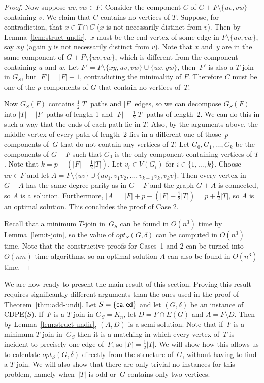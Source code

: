 \documentclass[11pt]{llncs}
\newcommand{\opts}{opt_S}
\newcommand{\ed}{{\sf ed}}
\newcommand{\ea}{{\sf ea}}
\newcommand{\cdpe}{{\sc CDPE}}
\begin{document}
\begin{proof}
Now suppose $uv,vw \in F$. Consider the component $C$ of
$G+F\setminus\{uv,vw\}$ containing $v$. We claim that $C$ contains no vertices
of $T$. Suppose, for contradiction, that $x \in T \cap C$ ($x$ is not
necessarily distinct from $v$). Then by Lemma~\ref{lem:struct-undir},~$x$ must
be the end-vertex of some edge in $F\setminus\{uv,vw\}$, say $xy$ (again $y$ is
not necessarily distinct from $v$). Note that $x$ and~$y$ are in the same
component of $G+F\setminus\{uv,vw\}$, which is different from the component
containing $u$ and $w$. Let $F'=F\setminus\{xy,uv,vw\}\cup\{ux,yw\}$, then~$F'$
is also a $T$-join in $G_S$, but $|F'|=|F|-1$, contradicting the minimality of
$F$. Therefore $C$ must be one of the $p$ components of $G$ that contain no
vertices of~$T$.

Now $G_S(F)$ contains $\frac{1}{2}|T|$ paths and $|F|$ edges, so we can
decompose $G_S(F)$ into $|T|-|F|$ paths of length 1 and $|F|-\frac{1}{2}|T|$
paths of length~2. We can do this in such a way that the ends of each path lie
in $T$.  Also, by the arguments above, the middle vertex of every path of length~2
lies in a different one of those~$p$ components of~$G$ that do not contain any
vertices of $T$.  Let $G_0,G_1,\ldots,G_k$ be the components of $G+F$ such that
$G_0$ is the only component containing vertices of $T$. Note that
$k=p-(|F|-\frac{1}{2}|T|)$.  Let $v_i \in V(G_i)$ for $i \in \{1,\ldots,k\}$.
Choose $uv \in F$ and let $A=F
\setminus\{uv\}\cup\{uv_1,v_1v_2,\ldots,v_{k-1}v_k,v_kv\}$. Then every vertex
in $G+A$ has the same degree parity as in $G+F$ and the graph $G+A$ is
connected, so $A$ is a solution. Furthermore, $|A|= |F|+p-(|F|-\frac{1}{2}|T|)=
p+\frac{1}{2}|T|$, so $A$ is an optimal solution.  This concludes the proof of
Case 2.

\medskip
\noindent
Recall that a minimum $T$-join in~$G_S$ can be found in $O(n^3)$ time by
Lemma~\ref{lem:t-join}, so the value of $\opts(G,\delta)$ can be computed in
$O(n^3)$ time. Note that the constructive proofs for Cases~1 and 2 can be
turned into
$O(nm)$ time algorithms, so an optimal solution $A$ can also be found in
$O(n^3)$ time.
\end{proof}


We are now ready to present the main result of this section. 
Proving this result requires significantly different arguments than the ones used in the proof of Theorem~\ref{thm:add-undi}.
Let $S=\{\ea,\ed\}$ and let $(G,\delta)$ be an instance of \cdpe($S$). If~$F$
is a $T$-join in $G_S=K_n$, let $D=F \cap E(G)$ and $A=F \setminus D$. Then by
Lemma~\ref{lem:struct-undir}, $(A,D)$ is a semi-solution.  Note that if~$F$ is
a minimum $T$-join in~$G_S$ then it is a matching in which every vertex of~$T$
is incident to precisely one edge of~$F$, so $|F|=\frac{1}{2}|T|$. We will show
how this allows us to calculate $\opts(G,\delta)$ directly from the structure
of~$G$, without having to find a $T$-join. We will also show that there are
only trivial no-instances for this problem,
namely when~$|T|$ is odd or~$G$ contains only two vertices.
\end{document}
